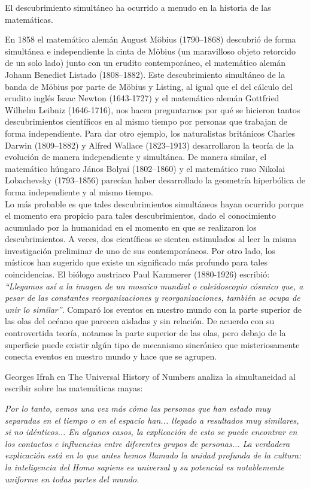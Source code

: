 \documentclass{article}
\begin{document}
El descubrimiento simult\'aneo ha ocurrido a menudo en la historia de las
matem\'aticas.

En 1858 el matem\'atico alem\'an August Möbius (1790–1868) descubri\'o de forma simult\'anea e independiente
la cinta de Möbius (un maravilloso objeto retorcido de un solo lado) junto con
un erudito contempor\'aneo, el matem\'atico alem\'an Johann Benedict Listado
(1808–1882). Este descubrimiento simult\'aneo de la banda de Möbius por parte de
Möbius y Listing, al igual que el del c\'alculo del erudito ingl\'es Isaac Newton
(1643-1727) y el matem\'atico alem\'an Gottfried Wilhelm Leibniz (1646-1716), nos
hacen preguntarnos por qu\'e se hicieron tantos descubrimientos cient\'ificos en al
mismo tiempo por personas que trabajan de forma independiente. Para dar otro
ejemplo, los naturalistas brit\'anicos Charles Darwin (1809–1882) y Alfred Wallace
(1823–1913) desarrollaron la teor\'ia de la evoluci\'on de manera independiente y
simult\'anea. De manera similar, el matem\'atico h\'ungaro J\'anos Bolyai (1802–1860) y
el matem\'atico ruso Nikolai Lobachevsky (1793–1856) parec\'ian haber desarrollado
la geometr\'ia hiperb\'olica de forma independiente y al mismo tiempo. \\

Lo m\'as probable es que tales descubrimientos simult\'aneos hayan ocurrido porque
el momento era propicio para tales descubrimientos, dado el conocimiento
acumulado por la humanidad en el momento en que se realizaron los
descubrimientos. A veces, dos cient\'ificos se sienten estimulados al leer la
misma investigaci\'on preliminar de uno de sus contempor\'aneos. Por otro lado, los
m\'isticos han sugerido que existe un significado m\'as profundo para tales
coincidencias. El bi\'ologo austriaco Paul Kammerer (1880-1926) escribi\'o:
\textit{“Llegamos as\'i a la imagen de un mosaico mundial o caleidoscopio c\'osmico que, a
pesar de las constantes reorganizaciones y reorganizaciones, tambi\'en se ocupa de
unir lo similar”}. Compar\'o los eventos en nuestro mundo con la parte superior de
las olas del oc\'eano que parecen aisladas y sin relaci\'on. De acuerdo con su
controvertida teor\'ia, notamos la parte superior de las olas, pero debajo de la
superficie puede existir alg\'un tipo de mecanismo sincr\'onico que misteriosamente
conecta eventos en nuestro mundo y hace que se agrupen.

Georges Ifrah en The Universal History of Numbers analiza la simultaneidad al
escribir sobre las matem\'aticas mayas:

\textit{Por lo tanto, vemos una vez m\'as c\'omo las personas que han estado muy separadas
en el tiempo o en el espacio han... llegado a resultados muy similares, si no
id\'enticos... En algunos casos, la explicaci\'on de esto se puede encontrar en los
contactos e influencias entre diferentes grupos de personas... La verdadera
explicaci\'on est\'a en lo que antes hemos llamado la unidad profunda de la cultura:
la inteligencia del Homo sapiens es universal y su potencial es notablemente
uniforme en todas partes del mundo.}
\end{document}
